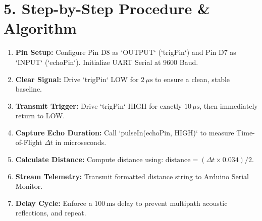 \documentclass[10pt,a4paper]{article}
\begin{document}
\section*{5. Step-by-Step Procedure \& Algorithm}
\begin{enumerate}[noitemsep]
    \item \textbf{Pin Setup:} Configure Pin D8 as `OUTPUT` (`trigPin`) and Pin D7 as `INPUT` (`echoPin`). Initialize UART Serial at 9600 Baud.
    \item \textbf{Clear Signal:} Drive `trigPin` LOW for $2\,\mu\text{s}$ to ensure a clean, stable baseline.
    \item \textbf{Transmit Trigger:} Drive `trigPin` HIGH for exactly $10\,\mu\text{s}$, then immediately return to LOW.
    \item \textbf{Capture Echo Duration:} Call `pulseIn(echoPin, HIGH)` to measure Time-of-Flight $\Delta t$ in microseconds.
    \item \textbf{Calculate Distance:} Compute distance using: $\text{distance} = (\Delta t \times 0.034) / 2$.
    \item \textbf{Stream Telemetry:} Transmit formatted distance string to Arduino Serial Monitor.
    \item \textbf{Delay Cycle:} Enforce a $100\,\text{ms}$ delay to prevent multipath acoustic reflections, and repeat.
\end{enumerate}
\end{document}
